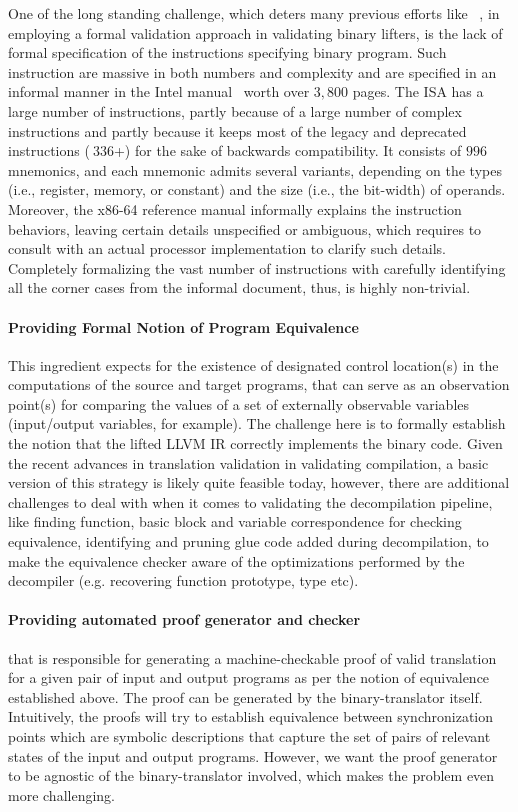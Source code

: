 One of the long standing challenge, which deters many previous efforts like
~\cite{ASE2017}, in employing a formal validation approach in validating
binary lifters, is the lack of formal specification of the \ISA instructions
specifying binary program. Such instruction are massive in both numbers and
complexity and are specified in an informal manner in the Intel
manual~\cite{IntelManual} worth over $3,800$ pages. The \ISA ISA has a large
number of instructions, partly because of a large number of complex
instructions and partly because it keeps most of the legacy and deprecated
instructions ($~336$+) for the sake of backwards compatibility. It consists of
$996$ mnemonics, and each mnemonic admits several variants, depending on the
types (i.e., register, memory, or constant) and the size (i.e., the bit-width)
  of operands. Moreover, the x86-64 reference manual informally explains the
  instruction behaviors, leaving certain details unspecified or ambiguous,
  which requires  to consult with an actual processor implementation to clarify
  such details. Completely formalizing the vast number of instructions with
  carefully identifying all the corner cases from the informal document, thus,
  is highly non-trivial.

\paragraph{Providing Formal Notion of Program Equivalence} This ingredient
expects for the existence of designated control location(s) in the computations
of the source and target programs, that can serve as an observation point(s)
  for comparing the values of a set of externally observable variables
  (input/output variables, for example). The challenge here is to formally
  establish the notion that the lifted LLVM IR  correctly implements the \ISA
  binary code. Given the recent advances in translation validation in
  validating compilation, a basic version of this strategy is likely quite
  feasible today, however, there are additional challenges to deal with when it
  comes to validating the decompilation pipeline, like finding function, basic
  block and variable correspondence for checking equivalence, identifying and
  pruning glue code added during decompilation, to make the equivalence checker
  aware of the optimizations performed by the decompiler (e.g.  recovering
      function prototype, type etc).

\paragraph{Providing automated proof generator and checker} that is responsible
for generating a machine-checkable proof  of valid translation for a given pair
of input and output programs as per the notion of equivalence established
above. The proof can be generated by  the binary-translator itself.
Intuitively, the proofs will try to establish equivalence between
synchronization points which are symbolic descriptions that capture the set of
pairs of relevant states of the input and output programs. However, we want 
the proof generator to be agnostic of the binary-translator involved, which 
makes the problem  even more challenging.   



